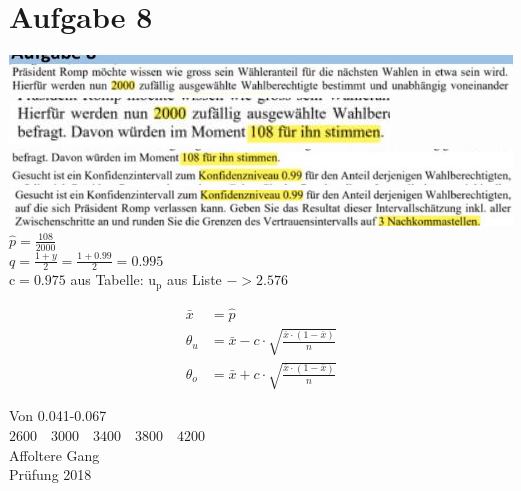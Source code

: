 \documentclass[10pt]{article}
\begin{document}
{\section*{Aufgabe 8}
\includegraphics[width=\linewidth]{images/2024_12_29_0906b02acf849bda8665g-4(1)}\\
\includegraphics[width=\linewidth]{images/2024_12_29_0906b02acf849bda8665g-4(10)}\\
\includegraphics[width=\linewidth]{images/2024_12_29_0906b02acf849bda8665g-4(11)}\\
\includegraphics[width=\linewidth]{images/2024_12_29_0906b02acf849bda8665g-4(8)} $\hat{p}=\frac{108}{2000}$\\
$q=\frac{1+y}{2}=\frac{1+0.99}{2}=0.995$\\
$\mathrm{c}=0.975$ aus Tabelle: $\mathrm{u}_{\mathrm{p}}$ aus Liste $->2.576$

$$
\begin{aligned}
\bar{x} & =\hat{p} \\
\theta_{u} & =\bar{x}-c \cdot \sqrt{\frac{\bar{x} \cdot(1-\bar{x})}{n}} \\
\theta_{o} & =\bar{x}+c \cdot \sqrt{\frac{\bar{x} \cdot(1-\bar{x})}{n}}
\end{aligned}
$$

Von 0.041-0.067\\
$2600 \quad 3000 \quad 3400 \quad 3800 \quad 4200$\\
Affoltere Gang\\
Prüfung 2018

}
\end{document}
